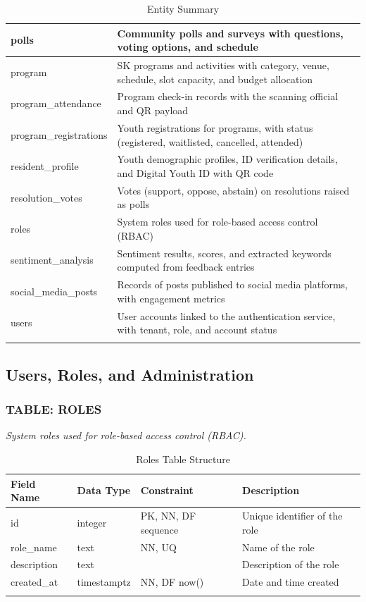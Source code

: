 \begin{longtable}{|p{4.5cm}|p{9.5cm}|}
polls & Community polls and surveys with questions, voting options, and schedule \\ \hline
program & SK programs and activities with category, venue, schedule, slot capacity, and budget allocation \\ \hline
program\_attendance & Program check-in records with the scanning official and QR payload \\ \hline
program\_registrations & Youth registrations for programs, with status (registered, waitlisted, cancelled, attended) \\ \hline
resident\_profile & Youth demographic profiles, ID verification details, and Digital Youth ID with QR code \\ \hline
resolution\_votes & Votes (support, oppose, abstain) on resolutions raised as polls \\ \hline
roles & System roles used for role-based access control (RBAC) \\ \hline
sentiment\_analysis & Sentiment results, scores, and extracted keywords computed from feedback entries \\ \hline
social\_media\_posts & Records of posts published to social media platforms, with engagement metrics \\ \hline
users & User accounts linked to the authentication service, with tenant, role, and account status \\ \hline
\caption{Entity Summary}
\label{tab:entity_summary}
\end{longtable}
\vspace{5mm}

\subsection{Users, Roles, and Administration}

\subsubsection*{TABLE: ROLES}
\noindent\textit{System roles used for role-based access control (RBAC).}
\begin{longtable}{|p{3.2cm}|p{2.2cm}|p{3.2cm}|p{5.4cm}|}
\hline
\textbf{Field Name} & \textbf{Data Type} & \textbf{Constraint} & \textbf{Description} \\ \hline
\endhead
\hline \endfoot
\hline \endlastfoot
id & integer & PK, NN, DF sequence & Unique identifier of the role \\ \hline
role\_name & text & NN, UQ & Name of the role \\ \hline
description & text & & Description of the role \\ \hline
created\_at & timestamptz & NN, DF now() & Date and time created \\ \hline
\caption{Roles Table Structure}
\label{tab:roles}
\end{longtable}
\vspace{3mm}

